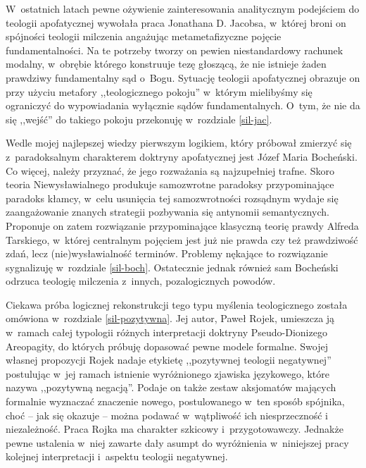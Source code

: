 W~ostatnich latach pewne ożywienie zainteresowania analitycznym podejściem do teologii apofatycznej wywołała praca Jonathana D. Jacobsa, w~której broni on spójności teologii milczenia angażując metametafizyczne pojęcie fundamentalności. Na te potrzeby tworzy on pewien niestandardowy rachunek modalny, w~obrębie którego konstruuje tezę głoszącą, że nie istnieje żaden prawdziwy fundamentalny sąd o~Bogu. Sytuację teologii apofatycznej obrazuje on przy użyciu metafory ,,teologicznego pokoju'' w~którym mielibyśmy się ograniczyć do wypowiadania wyłącznie sądów fundamentalnych. O~tym, że nie da się ,,wejść'' do takiego pokoju przekonuję w~rozdziale \ref{sil-jac}.

Wedle mojej najlepszej wiedzy pierwszym logikiem, który próbował zmierzyć się z~paradoksalnym charakterem doktryny apofatycznej jest Józef Maria Bocheński. Co więcej, należy przyznać, że jego rozważania są najzupełniej trafne. Skoro teoria Niewysławialnego produkuje samozwrotne paradoksy przypominające paradoks kłamcy, w~celu usunięcia tej samozwrotności rozsądnym wydaje się zaangażowanie znanych strategii pozbywania się antynomii semantycznych. Proponuje on zatem rozwiązanie przypominające klasyczną teorię prawdy Alfreda Tarskiego, w~której centralnym pojęciem jest już nie prawda czy też prawdziwość zdań, lecz (nie)wysławialność terminów. Problemy nękające to rozwiązanie sygnalizuję w~rozdziale \ref{sil-boch}. Ostatecznie jednak również sam Bocheński odrzuca teologię milczenia z~innych, pozalogicznych powodów.

Ciekawa próba logicznej rekonstrukcji tego typu myślenia teologicznego została omówiona w~rozdziale \ref{sil-pozytywna}. Jej autor, Paweł Rojek, umieszcza ją w~ramach całej typologii różnych interpretacji doktryny Pseudo-Dionizego Areopagity, do których próbuję dopasować pewne modele formalne. Swojej własnej propozycji Rojek nadaje etykietę ,,pozytywnej teologii negatywnej'' postulując w~jej ramach istnienie wyróżnionego zjawiska językowego, które nazywa ,,pozytywną negacją''. Podaje on także zestaw aksjomatów mających formalnie wyznaczać znaczenie nowego, postulowanego w~ten sposób spójnika, choć -- jak się okazuje -- można podawać w~wątpliwość ich niesprzeczność i niezależność. Praca Rojka ma charakter szkicowy i~przygotowawczy. Jednakże pewne ustalenia w~niej zawarte dały asumpt do wyróżnienia w~niniejszej pracy kolejnej interpretacji i~aspektu teologii negatywnej.

